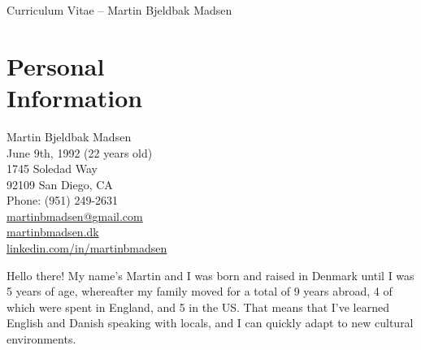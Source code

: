 \documentclass[margin,line]{resume}
\begin{document}
\raggedright
{\sc \Large Curriculum Vitae -- Martin Bjeldbak Madsen}
\begin{resume}
    \vspace{0.5cm}
    \begin{figure}
         \vspace{-1cm}
        \begin{center}
        \end{center}
         \vspace{-2.75cm}
    \end{figure}

    \section{\mysidestyle Personal\\Information}%
    Martin Bjeldbak Madsen\\
    June 9th, 1992 (22 years old)\\ 
    1745 Soledad Way \\
    92109 San Diego, CA \\
    Phone: (951) 249-2631\\
    \href{mailto:martinbmadsen@gmail.com}{martinbmadsen@gmail.com}\\
    \href{http://martinbmadsen.dk}{martinbmadsen.dk}\\
    \href{http://dk.linkedin.com/in/martinbmadsen/}{linkedin.com/in/martinbmadsen}
    \vspace{1.25cm}

    Hello there! My name's Martin and I was born and raised in Denmark
    until I was 5 years of age, whereafter my family moved for a total
    of 9 years abroad, 4 of which were spent in England, and 5 in the
    US. That means that I've learned English and Danish speaking with
    locals, and I can quickly adapt to new cultural environments.


\end{resume}
\end{document}
